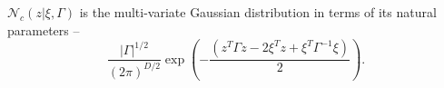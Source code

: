 \documentclass[a4paper]{article}
\newcommand{\cNc}{\mathcal{N}_c}
\newcommand{\cQ}{\mathcal{Q}}
\newcommand{\cR}{\mathcal{R}}
\newcommand{\cX}{\mathcal{X}}
\DeclareMathOperator{\NN}{NN}
\newcommand{\infnn}{\NN^{(i)}_\phi}
\begin{document}
$\cNc(z | \xi, \Gamma)$ is the multi-variate Gaussian distribution in terms of its natural parameters --
\[
\frac{|\Gamma|^{1/2}}{(2\pi)^{D/2}}\exp\left(-\frac{(z^T \Gamma z - 2\xi^T z + \xi^T\Gamma^{-1}\xi)}{2} \right).
\]










\end{document}
